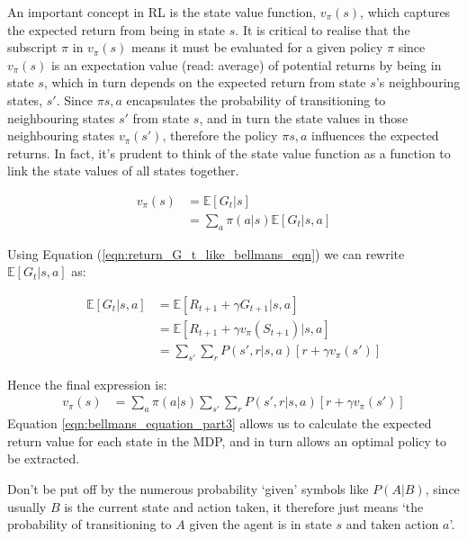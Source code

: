 \documentclass[a4paper,11pt]{article}
\begin{document}
An important concept in RL is the state value function, $v_{\pi}(s)$, which captures the expected return from being in state $s$.  It is critical to realise that the subscript $\pi$ in $v_{\pi}(s)$ means it must be evaluated for a given policy $\pi$ since $v_{\pi}(s)$ is an expectation value (read: average) of potential returns by being in state $s$, which in turn depends on the expected return from state $s$'s neighbouring states, $s'$. Since $\pi{s,a}$ encapsulates the probability of transitioning to neighbouring states $s'$ from state $s$, and in turn the state values in those neighbouring states $v_\pi(s')$, therefore the policy $\pi{s,a}$ influences the expected returns.  In fact, it's prudent to think of the state value function as a function to link the state values of all states together.

\begin{equation} \label{eqn:bellmans_equation_part1}
\begin{split}
        v_\pi (s) &= \mathbb{E}[G_t|s] \\
        &= \sum_{a} \pi(a|s) \mathbb{E} [G_t|s,a]
\end{split}
\end{equation}

Using Equation (\ref{eqn:return_G_t_like_bellmans_eqn}) we can rewrite $\mathbb{E} [G_t|s, a]$ as:

\begin{equation} \label{eqn:bellmans_equation_part2}
\begin{split}
        \mathbb{E} [G_t|s, a] &= \mathbb{E} [R_{t+1} + \gamma G_{t+1}|s, a] \\
        &= \mathbb{E} [R_{t+1} + \gamma v_\pi(S_{t+1})|s, a] \\
        &= \sum_{s'} \sum_r P(s',r|s,a) [r + \gamma v_{\pi}(s')]
\end{split}
\end{equation}

Hence the final expression is:
\begin{equation} \label{eqn:bellmans_equation_part3}
\begin{split}
        v_\pi (s) &= \sum_{a} \pi(a|s) \sum_{s'} \sum_r P(s',r|s,a) [r + \gamma v_{\pi}(s')]
\end{split}
\end{equation}
Equation \ref{eqn:bellmans_equation_part3} allows us to calculate the expected return value for each state in the MDP, and in turn allows an optimal policy to be extracted. 

Don't be put off by the numerous probability `given' symbols like $P(A|B)$, since usually $B$ is the current state and action taken, it therefore just means `the probability of transitioning to $A$ given the agent is in state $s$ and taken action $a$'.  
\end{document}
